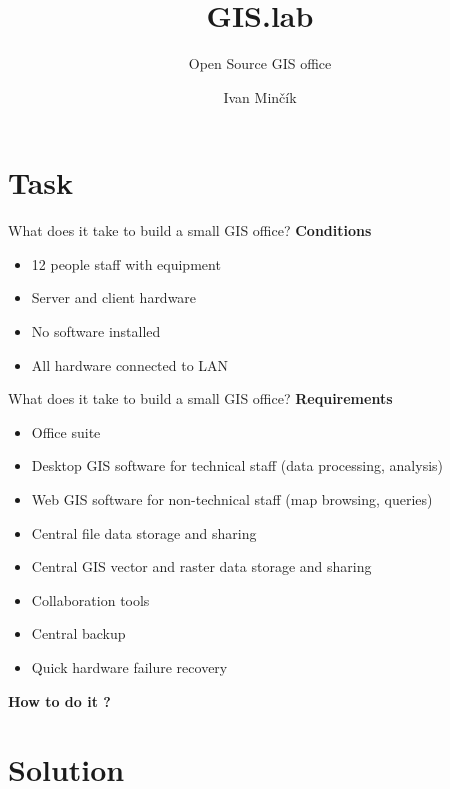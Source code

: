 \documentclass[12pt]{beamer}
\author{Ivan Minčík}
\title{GIS.lab}
\subtitle{Open Source GIS office}
\begin{document}
\begin{frame}
	\titlepage
\end{frame}


\section{Task}
\begin{frame}{What does it take to build a small GIS office?}
	\textbf{Conditions}
	\begin{itemize}
		\item 12 people staff with equipment
		\item Server and client hardware
		\item No software installed
		\item All hardware connected to LAN
	\end{itemize}
\end{frame}


\begin{frame}{What does it take to build a small GIS office?}
	\textbf{Requirements}
	\begin{itemize}[<+->]
		\item Office suite
		\item Desktop GIS software for technical staff (data processing, analysis)
		\item Web GIS software for non-technical staff (map browsing, queries)
		\item Central file data storage and sharing
		\item Central GIS vector and raster data storage and sharing
		\item Collaboration tools
		\item Central backup
		\item Quick hardware failure recovery
	\end{itemize}
\end{frame}


\begin{frame}
	\LARGE \textbf{How to do it ?}
\end{frame}


\section{Solution}
\end{document}
